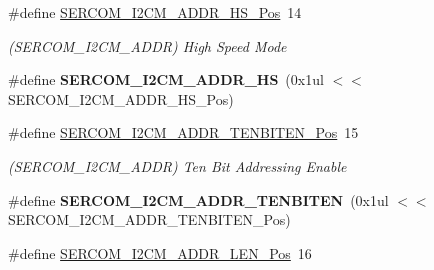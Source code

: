 \begin{DoxyCompactItemize}
\item 
\hypertarget{group___s_a_m_l21___s_e_r_c_o_m_ga94cc6da2fa6b60bf69d815d70527240c}{}\#define \hyperlink{group___s_a_m_l21___s_e_r_c_o_m_ga94cc6da2fa6b60bf69d815d70527240c}{S\+E\+R\+C\+O\+M\+\_\+\+I2\+C\+M\+\_\+\+A\+D\+D\+R\+\_\+\+H\+S\+\_\+\+Pos}~14\label{group___s_a_m_l21___s_e_r_c_o_m_ga94cc6da2fa6b60bf69d815d70527240c}

\begin{DoxyCompactList}\small\item\em (S\+E\+R\+C\+O\+M\+\_\+\+I2\+C\+M\+\_\+\+A\+D\+D\+R) High Speed Mode \end{DoxyCompactList}\item 
\hypertarget{group___s_a_m_l21___s_e_r_c_o_m_ga6adcd1943d1670aa897cc9e0c75c6f5c}{}\#define {\bfseries S\+E\+R\+C\+O\+M\+\_\+\+I2\+C\+M\+\_\+\+A\+D\+D\+R\+\_\+\+H\+S}~(0x1ul $<$$<$ S\+E\+R\+C\+O\+M\+\_\+\+I2\+C\+M\+\_\+\+A\+D\+D\+R\+\_\+\+H\+S\+\_\+\+Pos)\label{group___s_a_m_l21___s_e_r_c_o_m_ga6adcd1943d1670aa897cc9e0c75c6f5c}

\item 
\hypertarget{group___s_a_m_l21___s_e_r_c_o_m_gaa75ef7da140f3f9cf0f9e7c36e5c948a}{}\#define \hyperlink{group___s_a_m_l21___s_e_r_c_o_m_gaa75ef7da140f3f9cf0f9e7c36e5c948a}{S\+E\+R\+C\+O\+M\+\_\+\+I2\+C\+M\+\_\+\+A\+D\+D\+R\+\_\+\+T\+E\+N\+B\+I\+T\+E\+N\+\_\+\+Pos}~15\label{group___s_a_m_l21___s_e_r_c_o_m_gaa75ef7da140f3f9cf0f9e7c36e5c948a}

\begin{DoxyCompactList}\small\item\em (S\+E\+R\+C\+O\+M\+\_\+\+I2\+C\+M\+\_\+\+A\+D\+D\+R) Ten Bit Addressing Enable \end{DoxyCompactList}\item 
\hypertarget{group___s_a_m_l21___s_e_r_c_o_m_ga4f10f5b41f38e84e7f723aa06ef41e44}{}\#define {\bfseries S\+E\+R\+C\+O\+M\+\_\+\+I2\+C\+M\+\_\+\+A\+D\+D\+R\+\_\+\+T\+E\+N\+B\+I\+T\+E\+N}~(0x1ul $<$$<$ S\+E\+R\+C\+O\+M\+\_\+\+I2\+C\+M\+\_\+\+A\+D\+D\+R\+\_\+\+T\+E\+N\+B\+I\+T\+E\+N\+\_\+\+Pos)\label{group___s_a_m_l21___s_e_r_c_o_m_ga4f10f5b41f38e84e7f723aa06ef41e44}

\item 
\hypertarget{group___s_a_m_l21___s_e_r_c_o_m_ga1b1cb66bc06691628402f6552cc4d573}{}\#define \hyperlink{group___s_a_m_l21___s_e_r_c_o_m_ga1b1cb66bc06691628402f6552cc4d573}{S\+E\+R\+C\+O\+M\+\_\+\+I2\+C\+M\+\_\+\+A\+D\+D\+R\+\_\+\+L\+E\+N\+\_\+\+Pos}~16\label{group___s_a_m_l21___s_e_r_c_o_m_ga1b1cb66bc06691628402f6552cc4d573}


\end{DoxyCompactItemize}
